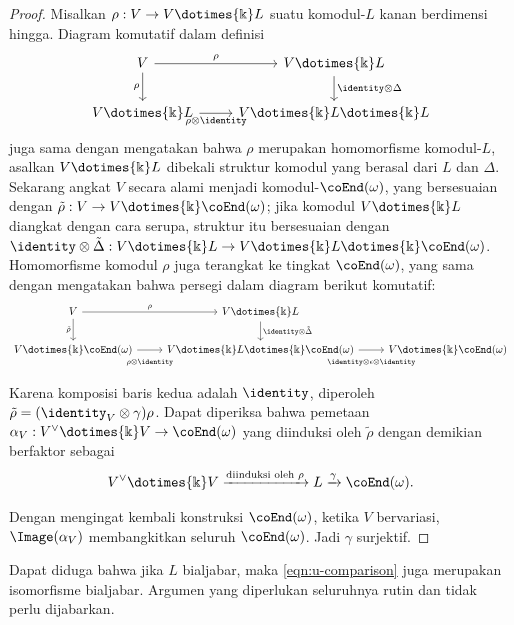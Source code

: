 \begin{proof}
	Misalkan $\rho: V \to V \dotimes{\Bbbk} L$ suatu komodul-$L$ kanan
	berdimensi hingga. Diagram komutatif dalam definisi
	\[\begin{tikzcd}
		V \arrow[r, "\rho"] \arrow[d, "\rho"'] & V \dotimes{\Bbbk} L \arrow[d, "{\identity \otimes \Delta}"] \\
		V \dotimes{\Bbbk} L \arrow[r, "{\rho \otimes \identity}"'] & V \dotimes{\Bbbk} L \dotimes{\Bbbk} L
	\end{tikzcd}\]
	juga sama dengan mengatakan bahwa $\rho$ merupakan homomorfisme
	komodul-$L$, asalkan $V \dotimes{\Bbbk} L$ dibekali struktur komodul
	yang berasal dari $L$ dan $\Delta$. Sekarang angkat $V$ secara alami
	menjadi komodul-$\coEnd(\omega)$, yang bersesuaian dengan
	$\tilde{\rho}: V \to V \dotimes{\Bbbk} \coEnd(\omega)$; jika komodul
	$V \dotimes{\Bbbk} L$ diangkat dengan cara serupa, struktur itu
	bersesuaian dengan
	$\identity \otimes \tilde{\Delta}: V \dotimes{\Bbbk} L \to V \dotimes{\Bbbk} L \dotimes{\Bbbk} \coEnd(\omega)$. Homomorfisme komodul
	$\rho$ juga terangkat ke tingkat $\coEnd(\omega)$, yang sama dengan
	mengatakan bahwa persegi dalam diagram berikut komutatif:
	\[\begin{tikzcd}
		V \arrow[r, "\rho"] \arrow[d, "{\tilde{\rho}}"'] & V \dotimes{\Bbbk} L \arrow[d, "{\identity \otimes \tilde{\Delta}}"] & \\
		V \dotimes{\Bbbk} \coEnd(\omega) \arrow[r, "{\rho \otimes \identity}"' inner sep=0.8em] & V \dotimes{\Bbbk} L \dotimes{\Bbbk} \coEnd(\omega) \arrow[r, "{\identity \otimes \epsilon \otimes \identity}"' inner sep=0.8em] & V \dotimes{\Bbbk} \coEnd(\omega)
	\end{tikzcd}\]
	Karena komposisi baris kedua adalah $\identity$, diperoleh
	$\tilde{\rho} = (\identity_V \otimes \gamma)\rho$. Dapat diperiksa
	bahwa pemetaan
	$\alpha_V: V^\vee \dotimes{\Bbbk} V \to \coEnd(\omega)$ yang diinduksi
	oleh $\tilde{\rho}$ dengan demikian berfaktor sebagai
	\[ V^\vee \dotimes{\Bbbk} V \xrightarrow{\text{diinduksi oleh $\rho$}} L \xrightarrow{\gamma} \coEnd(\omega). \]
	
	Dengan mengingat kembali konstruksi $\coEnd(\omega)$, ketika $V$
	bervariasi, $\Image(\alpha_V)$ membangkitkan seluruh $\coEnd(\omega)$.
	Jadi $\gamma$ surjektif.
\end{proof}

Dapat diduga bahwa jika $L$ bialjabar, maka \eqref{eqn:u-comparison} juga
merupakan isomorfisme bialjabar. Argumen yang diperlukan seluruhnya rutin
dan tidak perlu dijabarkan.

